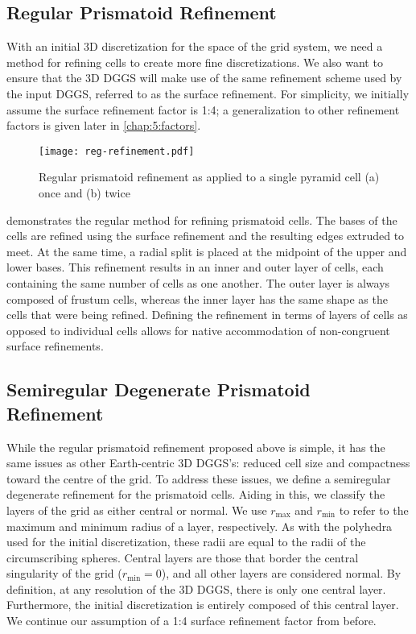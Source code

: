 \subsection{Regular Prismatoid Refinement} \label{chap:5:regular}
With an initial 3D discretization for the space of the grid system, we need a method for refining cells to create more fine discretizations.
We also want to ensure that the 3D DGGS will make use of the same refinement scheme used by the input DGGS, referred to as the surface refinement.
For simplicity, we initially assume the surface refinement factor is 1:4; a generalization to other refinement factors is given later in \cref{chap:5:factors}.


\begin{figure}[ht!]
	\centering
	\texttt{[image: reg-refinement.pdf]}
	\caption[Regular prismatoid refinement]{
		Regular prismatoid refinement as applied to a single pyramid cell (a) once and (b) twice
	}
	\label{fig:regular}
\end{figure}


 demonstrates the regular method for refining prismatoid cells.
The bases of the cells are refined using the surface refinement and the resulting edges extruded to meet.
At the same time, a radial split is placed at the midpoint of the upper and lower bases.
This refinement results in an inner and outer layer of cells, each containing the same number of cells as one another.
The outer layer is always composed of frustum cells, whereas the inner layer has the same shape as the cells that were being refined.
Defining the refinement in terms of layers of cells as opposed to individual cells allows for native accommodation of non-congruent surface refinements.


\subsection{Semiregular Degenerate Prismatoid Refinement} \label{chap:5:semireg}
While the regular prismatoid refinement proposed above is simple, it has the same issues as other Earth-centric 3D DGGS's: reduced cell size and compactness toward the centre of the grid.
To address these issues, we define a semiregular degenerate refinement for the prismatoid cells.
Aiding in this, we classify the layers of the grid as either central or normal.
We use $r_\mathrm{max}$ and $r_\mathrm{min}$ to refer to the maximum and minimum radius of a layer, respectively.
As with the polyhedra used for the initial discretization, these radii are equal to the radii of the circumscribing spheres.
Central layers are those that border the central singularity of the grid ($r_\mathrm{min} = 0$), and all other layers are considered normal.
By definition, at any resolution of the 3D DGGS, there is only one central layer.
Furthermore, the initial discretization is entirely composed of this central layer.
We continue our assumption of a 1:4 surface refinement factor from before.


